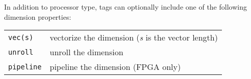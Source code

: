 In addition to processor type, tags can optionally include one of the following dimension properties:

{
\centering
{
    \footnotesize
    \setlength\tabcolsep{5pt}
    \begin{tabular}{ll}
        \texttt{vec(s)} & vectorize the dimension (\emph{s} is the vector length)\\
        \texttt{unroll} & unroll the dimension\\
        \texttt{pipeline} & pipeline the dimension (FPGA only)\\
    \end{tabular}
}
}





